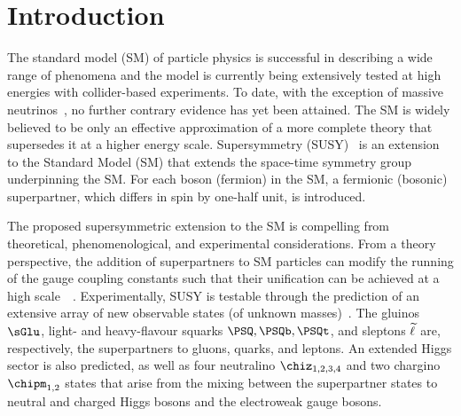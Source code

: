 \section{Introduction}
\label{sec:introduction}

The standard model (SM) of particle physics is successful in
describing a wide range of phenomena and the model is currently being
extensively tested at high energies with collider-based experiments.
To date, with the exception of massive neutrinos~\cite{Fukuda:1998mi,
  Ahmad:2001an, Ahmad:2002jz}, no further contrary evidence has yet
been attained. The SM is widely believed to be only an effective
approximation of a more complete theory that supersedes it at a higher
energy scale. Supersymmetry (SUSY)~\cite{ref:SUSY-1, ref:SUSY0,
  ref:SUSY3, ref:SUSY1} is an extension to the Standard Model (SM)
that extends the space-time symmetry group underpinning the SM. For
each boson (fermion) in the SM, a fermionic (bosonic) superpartner,
which differs in spin by one-half unit, is introduced.

The proposed supersymmetric extension to the SM is compelling from
theoretical, phenomenological, and experimental considerations.  From
a theory perspective, the addition of superpartners to SM particles
can modify the running of the gauge coupling constants such that their
unification can be achieved at a high scale~~\cite{Dimopoulos:1981yj,
  Ibanez:1981yh, Marciano:1981un}.  Experimentally, SUSY is testable
through the prediction of an extensive array of new observable states
(of unknown masses)~\cite{ref:SUSY4, ref:SUSY2}. The gluinos $\sGlu$,
light- and heavy-flavour squarks $\PSQ, \PSQb, \PSQt$, and sleptons
$\widetilde{\ell}$ are, respectively, the superpartners to gluons, quarks, and
leptons. An extended Higgs sector is also predicted, as well as four
neutralino $\chiz_{1,2,3,4}$ and two chargino $\chipm_{1,2}$ states
that arise from the mixing between the superpartner states to neutral
and charged Higgs bosons and the electroweak gauge bosons.

